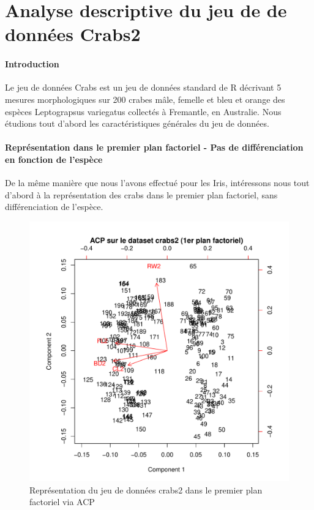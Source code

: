 \documentclass{report}
\begin{document}
\section{Analyse descriptive du jeu de de données Crabs2}
\paragraph{Introduction}
Le jeu de données Crabs est un jeu de données standard de R décrivant 5 mesures morphologiques sur 200 crabes mâle, femelle et bleu et orange des espèces Leptograpsus variegatus collectés à Fremantle, en Australie. Nous étudions tout d'abord les caractéristiques générales du jeu de données.
\paragraph{Représentation dans le premier plan factoriel - Pas de différenciation en fonction de l'espèce}
De la même manière que nous l'avons effectué pour les Iris, intéressons nous tout d'abord à la représentation des crabs dans le premier plan factoriel, sans différenciation de l'espèce.
\begin{figure}[ht!]
\begin{center}
    \includegraphics[width=\textwidth]{../plots/E1Q2_ACPcrabs.pdf}
    \caption{Représentation du jeu de données crabs2 dans le premier plan factoriel via ACP}
\end{center}
\end{figure}
\newpage
\end{document}
